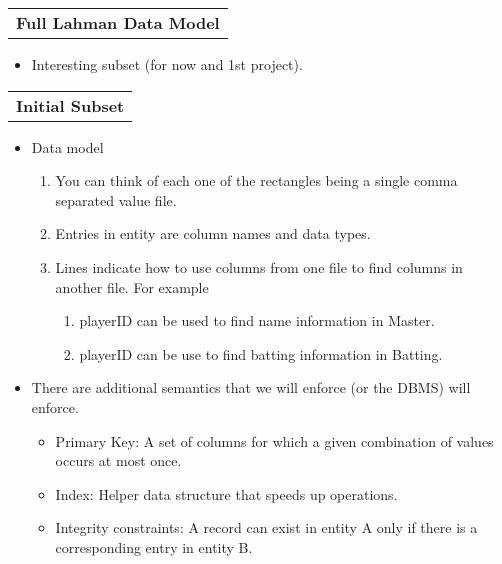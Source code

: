 \documentclass[11pt]{article}
\providecommand{\tightlist}{%
      \setlength{\itemsep}{0pt}\setlength{\parskip}{0pt}}
\begin{document}
\begin{longtable}[]{@{}c@{}}
\toprule
\tabularnewline
\midrule
\endhead
\textbf{Full Lahman Data Model}\tabularnewline
\bottomrule
\end{longtable}

\begin{itemize}
\tightlist
\item
  Interesting subset (for now and 1st project).
\end{itemize}

\begin{longtable}[]{@{}c@{}}
\toprule
\tabularnewline
\midrule
\endhead
\textbf{Initial Subset}\tabularnewline
\bottomrule
\end{longtable}

\begin{itemize}
\tightlist
\item
  Data model

  \begin{enumerate}
  \def\labelenumi{\arabic{enumi}.}
  \tightlist
  \item
    You can think of each one of the rectangles being a single comma
    separated value file.
  \item
    Entries in entity are column names and data types.
  \item
    Lines indicate how to use columns from one file to find columns in
    another file. For example

    \begin{enumerate}
    \def\labelenumii{\arabic{enumii}.}
    \tightlist
    \item
      playerID can be used to find name information in Master.
    \item
      playerID can be use to find batting information in Batting.
    \end{enumerate}
  \end{enumerate}
\item
  There are additional semantics that we will enforce (or the DBMS) will
  enforce.

  \begin{itemize}
  \tightlist
  \item
    Primary Key: A set of columns for which a given combination of
    values occurs at most once.
  \item
    Index: Helper data structure that speeds up operations.
  \item
    Integrity constraints: A record can exist in entity A only if there
    is a corresponding entry in entity B.
  \end{itemize}
\end{itemize}
\end{document}

